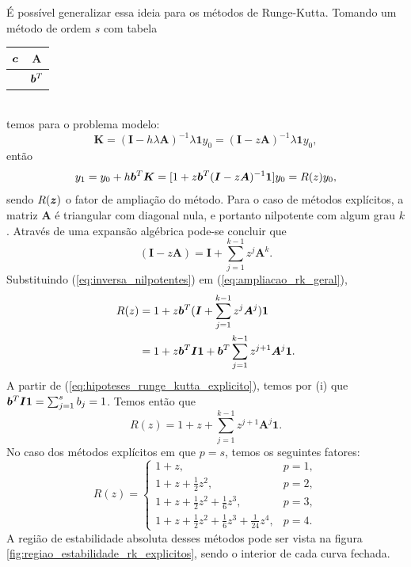 É possível generalizar essa ideia para os métodos de Runge-Kutta. Tomando um método de ordem $s$ com tabela
\begin{table}
    \centering
    \begin{tabular}{c|c}
        $\bm c$ &  $\bm A$ \\
        \hline & $\bm b^T$
    \end{tabular}
\end{table}\\
temos para o problema modelo:
\begin{equation}
    \bm K = (\bm I - h \lambda \bm A)^{-1} \lambda \bm 1 y_0
    = (\bm I - z \bm A)^{-1} \lambda \bm 1 y_0,
\end{equation}
então
\begin{equation}\label{eq:ampliacao_rk_geral}
    y_1 
    = y_0 + h \bm b^T \bm K
    = [1 + z \bm b^T (\bm I - z \bm A)^{-1} \bm 1] y_0
    = R(z) y_0,
\end{equation}
sendo $R(\bm z)$ o fator de ampliação do método. Para o caso de métodos explícitos, a matriz $\bm A$ é triangular com diagonal nula, e portanto nilpotente com algum grau $k$. Através de uma expansão algébrica pode-se concluir que
\begin{equation}\label{eq:inversa_nilpotentes}
    (\bm I - z \bm A) = \bm I + \sum_{j=1}^{k-1} z^j \bm A^k.
\end{equation}
Substituindo (\ref{eq:inversa_nilpotentes}) em (\ref{eq:ampliacao_rk_geral}),
\begin{align*}
    R(z) 
    &= 1 + z \bm b^T (\bm I + \sum_{j=1}^{k-1} z^j \bm A^j)\bm 1 \\
    &= 1 + z \bm b^T \bm I \bm 1 + \bm b^T \sum_{j=1}^{k-1} z^{j+1} \bm A^j \bm 1.
\end{align*}
A partir de (\ref{eq:hipoteses_runge_kutta_explicito}), temos por (i) que $\bm b^T \bm I \bm 1 = \sum_{j=1}^s b_j = 1$. Temos então que
\begin{equation}
    R(z) = 1 + z + \sum_{j=1}^{k-1} z^{j+1} \bm A^j \bm 1.
\end{equation}
No caso dos métodos explícitos em que $p=s$, temos os seguintes fatores:
\begin{equation}
    R (z) = \begin{cases}
    1 + z, & p = 1, \\
    1 + z + \frac{1}{2} z^2, & p = 2, \\
    1 + z + \frac{1}{2} z^2 + \frac{1}{6} z^3, & p = 3, \\
    1 + z + \frac{1}{2} z^2 + \frac{1}{6} z^3 + \frac{1}{24} z^4, & p = 4.
    \end{cases}
\end{equation}
A região de estabilidade absoluta desses métodos pode ser vista na figura \ref{fig:regiao_estabilidade_rk_explicitos}, sendo o interior de cada curva fechada.

